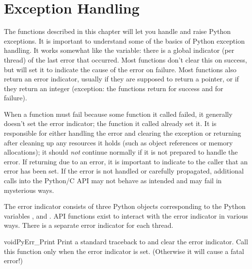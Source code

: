 \chapter{Exception Handling \label{exceptionHandling}}

The functions described in this chapter will let you handle and raise Python
exceptions.  It is important to understand some of the basics of
Python exception handling.  It works somewhat like the
\UNIX{}  variable: there is a global indicator (per
thread) of the last error that occurred.  Most functions don't clear
this on success, but will set it to indicate the cause of the error on
failure.  Most functions also return an error indicator, usually
\NULL{} if they are supposed to return a pointer, or  if they
return an integer (exception: the  functions
return  for success and  for failure).

When a function must fail because some function it called failed, it
generally doesn't set the error indicator; the function it called
already set it.  It is responsible for either handling the error and
clearing the exception or returning after cleaning up any resources it
holds (such as object references or memory allocations); it should
\emph{not} continue normally if it is not prepared to handle the
error.  If returning due to an error, it is important to indicate to
the caller that an error has been set.  If the error is not handled or
carefully propagated, additional calls into the Python/C API may not
behave as intended and may fail in mysterious ways.

The error indicator consists of three Python objects corresponding to
the Python variables ,  and
.  API functions exist to interact with the
error indicator in various ways.  There is a separate error indicator
for each thread.


\begin{cfuncdesc}{void}{PyErr_Print}{}
  Print a standard traceback to  and clear the error
  indicator.  Call this function only when the error indicator is
  set.  (Otherwise it will cause a fatal error!)
\end{cfuncdesc}


